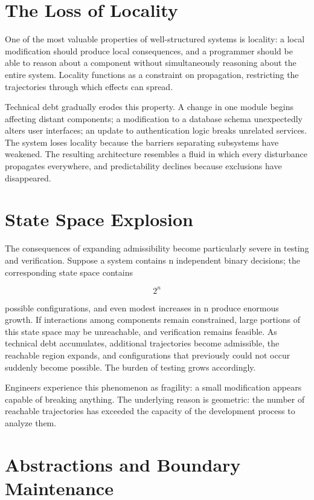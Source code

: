 \documentclass[11pt,oneside]{book}
\theoremstyle{plain}
\theoremstyle{definition}
\theoremstyle{remark}
\begin{document}
\section{The Loss of Locality}

One of the most valuable properties of well-structured systems is locality: a local modification should produce local consequences, and a programmer should be able to reason about a component without simultaneously reasoning about the entire system. Locality functions as a constraint on propagation, restricting the trajectories through which effects can spread.

Technical debt gradually erodes this property. A change in one module begins affecting distant components; a modification to a database schema unexpectedly alters user interfaces; an update to authentication logic breaks unrelated services. The system loses locality because the barriers separating subsystems have weakened. The resulting architecture resembles a fluid in which every disturbance propagates everywhere, and predictability declines because exclusions have disappeared.

\section{State Space Explosion}

The consequences of expanding admissibility become particularly severe in testing and verification. Suppose a system contains n independent binary decisions; the corresponding state space contains

\begin{equation}
2^n
\end{equation}

possible configurations, and even modest increases in n produce enormous growth. If interactions among components remain constrained, large portions of this state space may be unreachable, and verification remains feasible. As technical debt accumulates, additional trajectories become admissible, the reachable region expands, and configurations that previously could not occur suddenly become possible. The burden of testing grows accordingly.

Engineers experience this phenomenon as fragility: a small modification appears capable of breaking anything. The underlying reason is geometric: the number of reachable trajectories has exceeded the capacity of the development process to analyze them.

\section{Abstractions and Boundary Maintenance}
\end{document}
